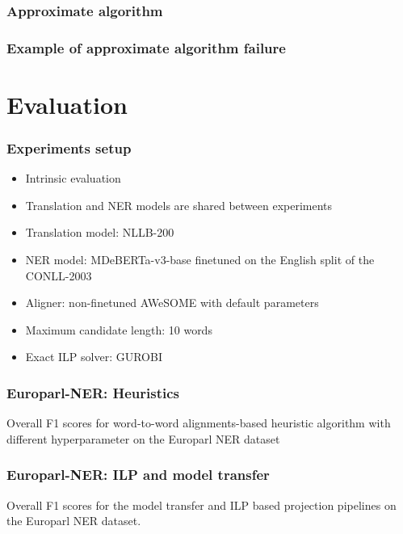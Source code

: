 \documentclass{beamer}
\begin{document}
\begin{frame}
  \frametitle{Approximate algorithm}
\end{frame}

\begin{frame}
  \frametitle{Example of approximate algorithm failure}
\end{frame}

\section{Evaluation}

\begin{frame}
  \frametitle{Experiments setup}

  \begin{itemize}
    \item Intrinsic evaluation
    \item Translation and NER models are shared between experiments
    \item Translation model: NLLB-200
    \item NER model: MDeBERTa-v3-base finetuned on the English split of the CONLL-2003
    \item Aligner: non-finetuned AWeSOME with default parameters
    \item Maximum candidate length: 10 words
    \item Exact ILP solver: GUROBI
  \end{itemize}
\end{frame}

\begin{frame}
  \frametitle{Europarl-NER: Heuristics}

  \begin{table}[ht]
    \centering
    \scalebox{0.75}{
      
    }
    \caption{Overall F1 scores for word-to-word alignments-based heuristic
    algorithm with different hyperparameter  on the Europarl NER dataset}
    \label{tab:europarl_heur_f1}
  \end{table}
\end{frame}

\begin{frame}
  \frametitle{Europarl-NER: ILP and model transfer}

  \begin{table}[t]
    \centering
    \scalebox{0.76}{
      
    }
    \caption{Overall F1 scores for the model transfer and ILP based projection pipelines
    on the Europarl NER dataset.}
    \label{tab:europarl_ilp_f1}
  \end{table}
\end{frame}
\end{document}

